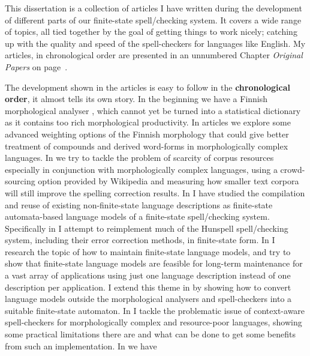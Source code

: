 \documentclass[officiallayout]{unihelcompling}
\begin{document}
This dissertation is a collection of articles I have written during the
development of different parts of our finite-state spell\-/checking system. It
covers a wide range of topics, all tied together by the goal of getting things
to work nicely; catching up with the quality and speed of the spell-checkers
for languages like English. My articles, in chronological order are presented
in an unnumbered Chapter \emph{Original Papers} on page~\pageref{chap:papers}.

The development shown in the articles is easy to follow in the
\textbf{chronological order}, it almost tells its own story. In the beginning
we have a Finnish morphological analyser \citep{pirinen2008suomen}, which
cannot yet be turned into a statistical dictionary as it contains too rich
morphological productivity. In articles
 we explore some advanced
weighting options of the Finnish morphology that could give better treatment of
compounds and derived word-forms in morphologically complex languages. In
 we try to tackle the problem of scarcity of
corpus resources especially in conjunction with morphologically complex
languages, using a crowd-sourcing option provided by Wikipedia and measuring
how smaller text corpora will still improve the spelling correction results. In
 I have studied the
compilation and reuse of existing non-finite-state language descriptions as
finite-state automata-based language models of a finite-state spell\-/checking
system.  Specifically in  I attempt to
reimplement much of the Hunspell spell\-/checking system, including their error
correction methods, in finite-state form. In
 I research the topic of how to maintain
finite-state language models, and try to show that finite-state language models
are feasible for long-term maintenance for a vast array of applications using
just one language description instead of one description per application.  I
extend this theme in  by showing how to
convert language models outside the morphological analysers and spell-checkers
into a suitable finite-state automaton. In  I
tackle the problematic issue of context-aware spell-checkers for
morphologically complex and resource-poor languages, showing some practical
limitations there are and what can be done to get some benefits from such an
implementation. In  we have
\end{document}
